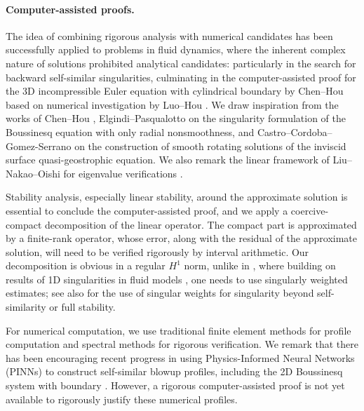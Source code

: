 \documentclass[11pt,a4paper]{article}
\numberwithin{equation}{section}
\begin{document}
\paragraph{Computer-assisted proofs.} 
The idea of combining rigorous analysis with numerical candidates has been successfully applied to problems in fluid dynamics, where the inherent complex nature of solutions prohibited analytical candidates: particularly in the search for backward self-similar singularities, culminating in the computer-assisted proof for the 3D incompressible Euler equation with cylindrical boundary by Chen--Hou \cite{chen2022stable, ChenHou2023b,ChenHou2025} based on numerical investigation by Luo--Hou \cite{luo2014potentially, luo2014toward}. We draw inspiration from the works of Chen--Hou \cite{chen2022stable}, Elgindi--Pasqualotto \cite{elgindi2023instability} on the singularity formulation of the Boussinesq equation with only radial nonsmoothness, and Castro--Cordoba--Gomez-Serrano \cite{castro2020global} on the construction of smooth rotating solutions of the inviscid surface quasi-geostrophic equation. We also remark the linear framework of Liu--Nakao--Oishi for eigenvalue verifications \cite{liu2013verified,liu2015framework,liu2022computer}.

Stability analysis, especially linear stability, around the approximate solution is essential to conclude the computer-assisted proof, and we apply a coercive-compact decomposition of the linear operator. The compact part is approximated by a finite-rank operator, whose error, along with the residual of the approximate solution, will need to be verified rigorously by interval arithmetic. Our decomposition is obvious in a regular $H^1$ norm, unlike in \cite{chen2022stable}, where building on results of 1D singularities in fluid models \cite{chen2020finite,chen2022asymptotically}, one needs to use singularly weighted estimates; see also \cite{hou20242,chen2024stability,liu2025finite} for the use of singular weights for singularity beyond self-similarity or full stability.

For numerical computation, we use traditional finite element methods for profile computation and spectral
methods for rigorous verification.
We remark that there has been encouraging recent progress in using Physics-Informed Neural Networks (PINNs) to construct self-similar blowup profiles, including the 2D Boussinesq system with boundary \cite{wang2023asymptotic, wang2025high, wang2025discovery}. However,  a rigorous computer-assisted proof is not yet available to rigorously justify these numerical profiles. 
\end{document}
